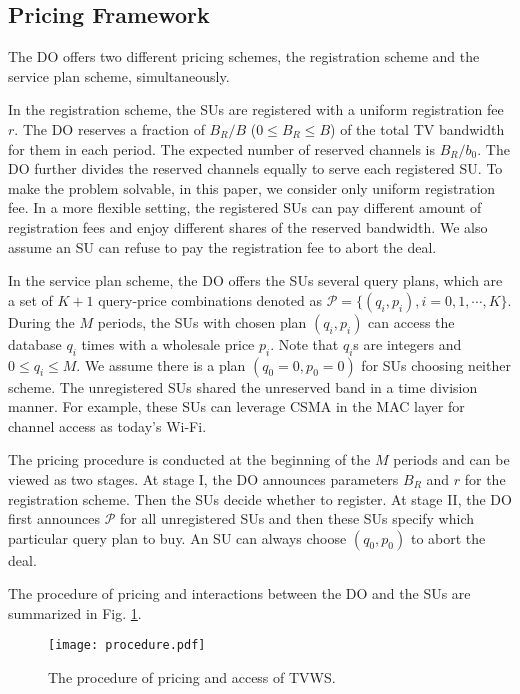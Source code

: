 \documentclass[journal]{IEEEtran}
\begin{document}
\subsection{Pricing Framework}
\label{subsec:framework}

The DO offers two different pricing schemes, the registration scheme and the service plan scheme, simultaneously.

In the registration scheme, the SUs are registered with a uniform registration fee $r$. The DO reserves a fraction of $B_R/B$ ($0\leq B_R \leq B$) of the total TV bandwidth for them in each period. The expected number of reserved channels is $B_R/b_0$. The DO further divides the reserved channels equally to serve each registered SU. To make the problem solvable, in this paper, we consider only uniform registration fee. In a more flexible setting, the registered SUs can pay different amount of registration fees and enjoy different shares of the reserved bandwidth.
We also assume an SU can refuse to pay the registration fee to abort the deal.

In the service plan scheme, the DO offers the SUs several query plans, which are a set of $K+1$ query-price combinations denoted as $\mathcal{P}=\{(q_i, p_i), i=0,1,\cdots, K\}$. During the $M$ periods, the SUs with chosen plan $(q_i, p_i)$ can access the database $q_i$ times with a wholesale price $p_i$.
Note that $q_i$s are integers and $0\leq q_i\leq M$.
We assume there is a plan $(q_0=0, p_0=0)$ for SUs choosing neither scheme. The unregistered SUs shared the unreserved band in a time division manner. For example, these SUs can leverage CSMA in the MAC layer for channel access as today's Wi-Fi.

The pricing procedure is conducted at the beginning of the $M$ periods and can be viewed as two stages. At stage I, the DO announces parameters $B_R$ and $r$ for the registration scheme. Then the SUs decide whether to register. At stage II, the DO first announces $\mathcal{P}$ for all unregistered SUs and then these SUs specify which particular query plan to buy. An SU can always choose $(q_0, p_0)$ to abort the deal.

The procedure of pricing and interactions between the DO and the SUs are summarized in Fig. \ref{fig:procedure}.

\begin{figure}[tp]
\centering
  \texttt{[image: procedure.pdf]}\\
  \caption{The procedure of pricing and access of TVWS.}
  \label{fig:procedure}
  \vspace{-0.0cm}
\end{figure}
\end{document}
